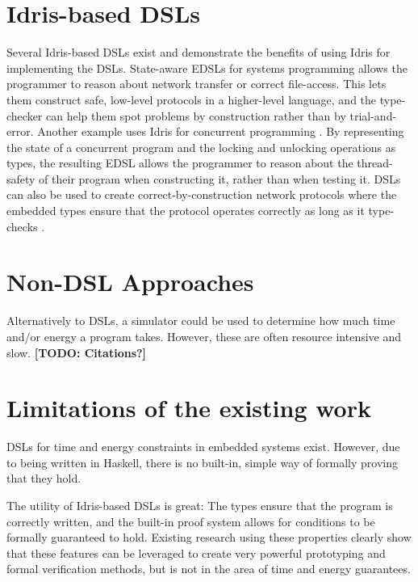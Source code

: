 \section{Idris-based DSLs}
	Several Idris-based DSLs exist and demonstrate the benefits of using Idris for implementing the DSLs. State-aware EDSLs for systems programming \cite{10.1007/978-3-642-27694-1_18} allows the programmer to reason about network transfer or correct file-access. This lets them construct safe, low-level protocols in a higher-level language, and the type-checker can help them spot problems by construction \cite{10.1007/978-3-642-27694-1_18} rather than by trial-and-error.
	Another example uses Idris for concurrent programming \cite{brady2010correct}. By representing the state of a concurrent program and the locking and unlocking operations as types, the resulting EDSL allows the programmer to reason about the thread-safety of their program when constructing it, rather than when testing it.
	DSLs can also be used to create correct-by-construction network protocols where the embedded types ensure that the protocol operates correctly as long as it type-checks \cite{5158855}.

\section{Non-DSL Approaches}
	Alternatively to DSLs, a simulator could be used to determine how much time and/or energy a program takes. However, these are often resource intensive and slow. \textbf{[TODO: Citations?]}

\section{Limitations of the existing work}
	DSLs for time and energy constraints in embedded systems exist. However, due to being written in Haskell, there is no built-in, simple way of formally proving that they hold.
	
	The utility of Idris-based DSLs is great: The types ensure that the program is correctly written, and the built-in proof system allows for conditions to be formally guaranteed to hold. Existing research using these properties \cite{10.1007/978-3-642-27694-1_18,brady2010correct,5158855} clearly show that these features can be leveraged to create very powerful prototyping and formal verification methods, but is not in the area of time and energy guarantees.
